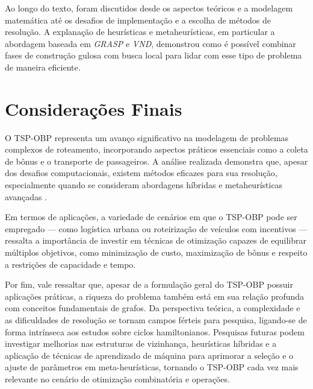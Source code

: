 \documentclass[12pt, a4paper]{report}
\begin{document}
Ao longo do texto, foram discutidos desde os aspectos teóricos e a modelagem matemática até os desafios de implementação e a escolha de métodos de resolução. A explanação de heurísticas e metaheurísticas, em particular a abordagem baseada em \emph{GRASP} e \emph{VND}, demonstrou como é possível combinar fases de construção gulosa com busca local para lidar com esse tipo de problema de maneira eficiente.

\section{Considerações Finais}

O TSP-OBP representa um avanço significativo na modelagem de problemas complexos de roteamento, incorporando aspectos práticos essenciais como a coleta de bônus e o transporte de passageiros. A análise realizada demonstra que, apesar dos desafios computacionais, existem métodos eficazes para sua resolução, especialmente quando se consideram abordagens híbridas e metaheurísticas avançadas \cite{lopesfilho2019, carvalho2022}.

Em termos de aplicações, a variedade de cenários em que o TSP-OBP pode ser empregado — como logística urbana ou roteirização de veículos com incentivos — ressalta a importância de investir em técnicas de otimização capazes de equilibrar múltiplos objetivos, como minimização de custo, maximização de bônus e respeito a restrições de capacidade e tempo.

Por fim, vale ressaltar que, apesar de a formulação geral do TSP-OBP possuir aplicações práticas, a riqueza do problema também está em sua relação profunda com conceitos fundamentais de grafos. Da perspectiva teórica, a complexidade e as dificuldades de resolução se tornam campos férteis para pesquisa, ligando-se de forma intrínseca aos estudos sobre ciclos hamiltonianos. Pesquisas futuras podem investigar melhorias nas estruturas de vizinhança, heurísticas híbridas e a aplicação de técnicas de aprendizado de máquina para aprimorar a seleção e o ajuste de parâmetros em meta-heurísticas, tornando o TSP-OBP cada vez mais relevante no cenário de otimização combinatória e operações. 

\newpage
\renewcommand{\refname}{Referências Bibliográficas}

\nocite{lopesfilho2019, carvalho2022, carnielli}
\end{document}
